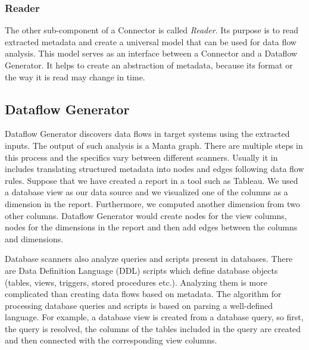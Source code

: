 \subsubsection{Reader}

The other sub-component of a Connector is called \textit{Reader}. Its purpose is to read extracted metadata and create a universal model that can be used for data flow analysis. This model serves as an interface between a Connector and a Dataflow Generator. It helps to create an abstraction of metadata, because its format or the way it is read may change in time.

\subsection{Dataflow Generator}

Dataflow Generator discovers data flows in target systems using the extracted inputs. The output of such analysis is a Manta graph. There are multiple steps in this process and the specifics vary between different scanners. Usually it in includes translating structured metadata into nodes and edges following data flow rules. Suppose that we have created a report in a tool such as Tableau. We used a database view as our data source and we visualized one of the columns as a dimension in the report. Furthermore, we computed another dimension from two other columns. Dataflow Generator would create nodes for the view columns, nodes for the dimensions in the report and then add edges between the columns and dimensions.
\par
Database scanners also analyze queries and scripts present in databases. There are Data Definition Language (DDL) scripts which define database objects (tables, views, triggers, stored procedures etc.). Analyzing them is more complicated than creating data flows based on metadata. The algorithm for processing database queries and scripts is based on parsing a well-defined language. For example, a database view is created from a database query, so first, the query is resolved, the columns of the tables included in the query are created and then connected with the corresponding view columns.

